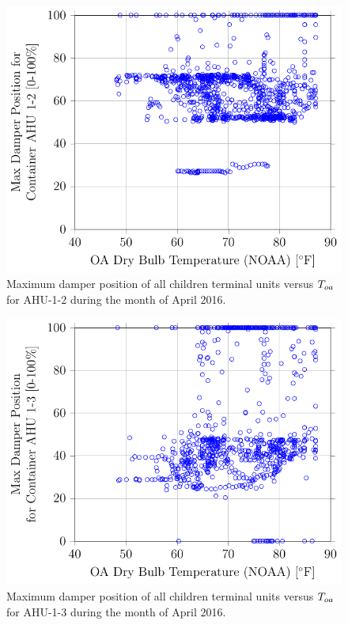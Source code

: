 \newcommand{\MaxDampCaption}[1]{Maximum damper position of all children terminal units versus \(\oat{}\) for #1 during the month of April 2016.}

\begin{figure}
\centering
\includegraphics{Plots/MaximumDamperPosition-1-2.pdf} 
\caption{\MaxDampCaption{AHU-1-2}}
\label{fig:MaxDamperPositionforContainerAHU12vsOADryBulbTemperatureNOAA}
\end{figure}

\begin{figure}
\centering
\includegraphics{Plots/MaximumDamperPosition-1-3.pdf}
\caption{\MaxDampCaption{AHU-1-3}}
\label{fig:MaxDamperPositionforContainerAHU13vsOADryBulbTemperatureNOAA}
\end{figure}


